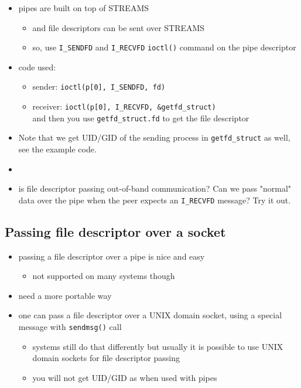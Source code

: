 \begin{itemize}
\item pipes are built on top of STREAMS
	\begin{itemize}
	\item and file descriptors can be sent over STREAMS
	\item so, use \texttt{I\_SENDFD} and \texttt{I\_RECVFD} \texttt{ioctl()}
	command on the pipe descriptor
	\end{itemize}
\item code used:
	\begin{itemize}
	\item sender: \texttt{ioctl(p[0], I\_SENDFD, fd)}
	\item receiver: \texttt{ioctl(p[0], I\_RECVFD, \&getfd\_struct)}\\
	and then you use \texttt{getfd\_struct.fd} to get the file descriptor

	\end{itemize}
\end{itemize}

\label{IOCTLEXAMPLE}

\begin{itemize}
\item Note that we get UID/GID of the sending process in \texttt{getfd\_struct}
as well, see the example code.
\item {}
\item {} is file descriptor passing out-of-band communication?
Can we pass "normal" data over the pipe when the peer expects an
\texttt{I\_RECVFD} message? Try it out.
\end{itemize}

\subsection{Passing file descriptor over a socket}

%
%

\begin{itemize}
\item passing a file descriptor over a pipe is nice and easy
	\begin{itemize}
	\item not supported on many systems though
	\end{itemize}
\item need a more portable way
\item one can pass a file descriptor over a UNIX domain socket, using a special
message with \texttt{sendmsg()} call
	\begin{itemize}
	\item systems still do that differently but usually it is possible to
	use UNIX domain sockets for file descriptor passing
	\item you will not get UID/GID as when used with pipes
	\end{itemize}
\end{itemize}

